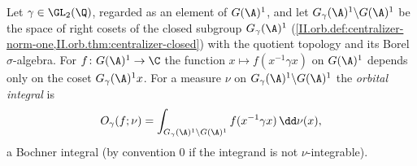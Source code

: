 Let $\gamma\in\GL_2(\Q)$, regarded as an element of $G(\A)^1$, and let $G_\gamma(\A)^1\backslash G(\A)^1$ be the space of right cosets of the closed
subgroup $G_\gamma(\A)^1$ (\cref{II.orb.def:centralizer-norm-one,II.orb.thm:centralizer-closed}) with the quotient topology and its Borel $\sigma$-algebra.
For $f\colon G(\A)^1\to\C$ the function $x\mapsto f(x^{-1}\gamma x)$ on $G(\A)^1$ depends only on the coset $G_\gamma(\A)^1x$. For a measure $\nu$ on
$G_\gamma(\A)^1\backslash G(\A)^1$ the \emph{orbital integral} is
\[
  O_\gamma(f;\nu)=\int_{G_\gamma(\A)^1\backslash G(\A)^1}f(x^{-1}\gamma x)\,\dd\nu(x),
\]
a Bochner integral (by convention $0$ if the integrand is not $\nu$-integrable).
